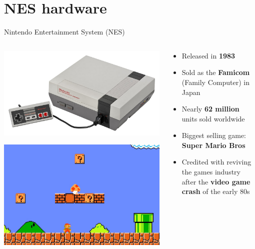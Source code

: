 \part{NES hardware}
\frame{\partpage}

\begin{frame}{Nintendo Entertainment System (NES)}
	\begin{columns}
		\begin{column}{0.32\textwidth}
			\includegraphics[width=\textwidth]{nes}
			
			\includegraphics[width=\textwidth]{supermario}
		\end{column}
		\begin{column}{0.64\textwidth}
			\begin{itemize}
				\pause\item Released in \textbf{1983}
				\pause\item Sold as the \textbf{Famicom} (Family Computer) in Japan
				\pause\item Nearly \textbf{62 million} units sold worldwide
				\pause\item Biggest selling game: \textbf{Super Mario Bros}
				\pause\item Credited with reviving the games industry after the \textbf{video game crash} of the early 80s
			\end{itemize}
		\end{column}
	\end{columns}
\end{frame}

